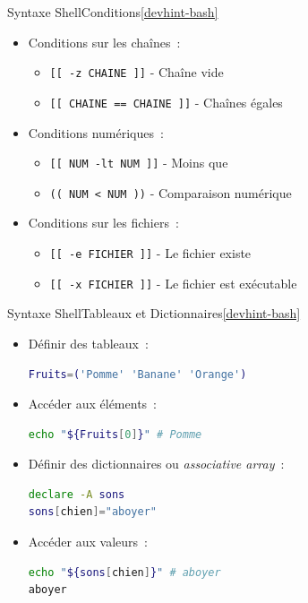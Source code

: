 \documentclass{beamer}
\begin{document}
    \begin{frame}{Syntaxe Shell}{Conditions\cref{devhint-bash}}
        \begin{itemize}
            \item Conditions sur les chaînes~:
            \begin{itemize}
                \item \lstinline{[[ -z CHAINE ]]} - Chaîne vide
                \item \lstinline{[[ CHAINE == CHAINE ]]} - Chaînes égales
            \end{itemize}
            \item Conditions numériques~:
            \begin{itemize}
                \item \lstinline{[[ NUM -lt NUM ]]} - Moins que
                \item \lstinline{(( NUM < NUM ))} - Comparaison numérique
            \end{itemize}
            \item Conditions sur les fichiers~:
            \begin{itemize}
                \item \lstinline{[[ -e FICHIER ]]} - Le fichier existe
                \item \lstinline{[[ -x FICHIER ]]} - Le fichier est exécutable
            \end{itemize}
        \end{itemize}
    \end{frame}

    \begin{frame}[fragile]{Syntaxe Shell}{Tableaux et Dictionnaires\cref{devhint-bash}}
        \begin{itemize}
            \item Définir des tableaux~:
            \begin{lstlisting}[language=bash]
Fruits=('Pomme' 'Banane' 'Orange')
            \end{lstlisting}
            \item Accéder aux éléments~:
            \begin{lstlisting}[language=bash]
echo "${Fruits[0]}" # Pomme
            \end{lstlisting}
            \item Définir des dictionnaires ou \textit{associative array}~:
            \begin{lstlisting}[language=bash]
declare -A sons
sons[chien]="aboyer"
            \end{lstlisting}
            \item Accéder aux valeurs~:
            \begin{lstlisting}[language=bash]
echo "${sons[chien]}" # aboyer
aboyer
            \end{lstlisting}
        \end{itemize}
    \end{frame}
\end{document}
